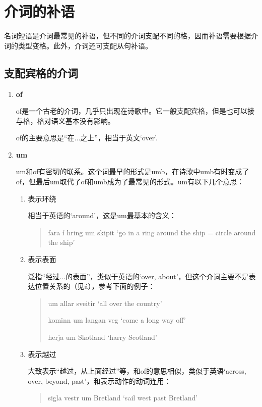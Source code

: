 \section{介词的补语}
名词短语是介词最常见的补语，但不同的介词支配不同的格，因而补语需要根据介词的类型变格。此外，介词还可支配从句补语。
\subsection{支配宾格的介词}
\begin{enumerate}[itemindent=1em, label=\textbf{\arabic*}.]
    \item \textbf{of}

          of是一个古老的介词，几乎只出现在诗歌中。它一般支配宾格，但是也可以接与格，格对语义基本没有影响。

          of的主要意思是“在...之上”，相当于英文`over'.

    \item \textbf{um}

          um和of有密切的联系。这个词最早的形式是umb，在诗歌中umb有时变成了of，但最后um取代了of和umb成为了最常见的形式。um有以下几个意思：
          \begin{enumerate}
              \item 表示环绕

                    相当于英语的`around'，这是um最基本的含义：
                    \begin{quote}
                        fara í hring um skipit `go in a ring around the ship = circle around the ship'
                    \end{quote}

              \item 表示表面

                    泛指“经过...的表面”，类似于英语的`over, about'，但这个介词主要不是表达位置关系的（见á），参考下面的例子：
                    \begin{quote}
                        um allar sveitir `all over the country'

                        kominn um langan veg `come a long way off'

                        herja um Skotland  `harry Scotland'
                    \end{quote}

              \item 表示越过

                    大致表示“越过，从上面经过”等，和of的意思相似，类似于英语`across, over, beyond, past'，和表示动作的动词连用：
                    \begin{quote}
                        sigla vestr um Bretland `sail west past Bretland'


\end{quote}
\end{enumerate}
\end{enumerate}
